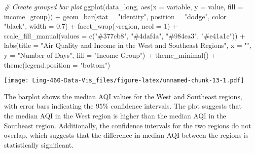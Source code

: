 \documentclass[
]{article}
\newenvironment{Shaded}{\begin{snugshade}}{\end{snugshade}}
\newcommand{\AttributeTok}[1]{\textcolor[rgb]{0.77,0.63,0.00}{#1}}
\newcommand{\CommentTok}[1]{\textcolor[rgb]{0.56,0.35,0.01}{\textit{#1}}}
\newcommand{\DecValTok}[1]{\textcolor[rgb]{0.00,0.00,0.81}{#1}}
\newcommand{\FloatTok}[1]{\textcolor[rgb]{0.00,0.00,0.81}{#1}}
\newcommand{\FunctionTok}[1]{\textcolor[rgb]{0.00,0.00,0.00}{#1}}
\newcommand{\NormalTok}[1]{#1}
\newcommand{\SpecialCharTok}[1]{\textcolor[rgb]{0.00,0.00,0.00}{#1}}
\newcommand{\StringTok}[1]{\textcolor[rgb]{0.31,0.60,0.02}{#1}}
\begin{document}
\begin{Shaded}
\begin{Highlighting}[]
\CommentTok{\# Create grouped bar plot}
\FunctionTok{ggplot}\NormalTok{(data\_long, }\FunctionTok{aes}\NormalTok{(}\AttributeTok{x =}\NormalTok{ variable, }\AttributeTok{y =}\NormalTok{ value, }\AttributeTok{fill =}\NormalTok{ income\_group)) }\SpecialCharTok{+}
  \FunctionTok{geom\_bar}\NormalTok{(}\AttributeTok{stat =} \StringTok{"identity"}\NormalTok{, }\AttributeTok{position =} \StringTok{"dodge"}\NormalTok{, }\AttributeTok{color =} \StringTok{"black"}\NormalTok{, }\AttributeTok{width =} \FloatTok{0.7}\NormalTok{) }\SpecialCharTok{+}
  \FunctionTok{facet\_wrap}\NormalTok{(}\SpecialCharTok{\textasciitilde{}}\NormalTok{region, }\AttributeTok{ncol =} \DecValTok{1}\NormalTok{) }\SpecialCharTok{+}
  \FunctionTok{scale\_fill\_manual}\NormalTok{(}\AttributeTok{values =} \FunctionTok{c}\NormalTok{(}\StringTok{"\#377eb8"}\NormalTok{, }\StringTok{"\#4daf4a"}\NormalTok{, }\StringTok{"\#984ea3"}\NormalTok{, }\StringTok{"\#e41a1c"}\NormalTok{)) }\SpecialCharTok{+}
  \FunctionTok{labs}\NormalTok{(}\AttributeTok{title =} \StringTok{"Air Quality and Income in the West and Southeast Regions"}\NormalTok{,}
       \AttributeTok{x =} \StringTok{""}\NormalTok{,}
       \AttributeTok{y =} \StringTok{"Number of Days"}\NormalTok{,}
       \AttributeTok{fill =} \StringTok{"Income Group"}\NormalTok{) }\SpecialCharTok{+}
  \FunctionTok{theme\_minimal}\NormalTok{() }\SpecialCharTok{+}
  \FunctionTok{theme}\NormalTok{(}\AttributeTok{legend.position =} \StringTok{"bottom"}\NormalTok{)}
\end{Highlighting}
\end{Shaded}

\texttt{[image: Ling-460-Data-Vis\_files/figure-latex/unnamed-chunk-13-1.pdf]}

The barplot shows the median AQI values for the West and Southeast
regions, with error bars indicating the 95\% confidence intervals. The
plot suggests that the median AQI in the West region is higher than the
median AQI in the Southeast region. Additionally, the confidence
intervals for the two regions do not overlap, which suggests that the
difference in median AQI between the regions is statistically
significant.
\end{document}

